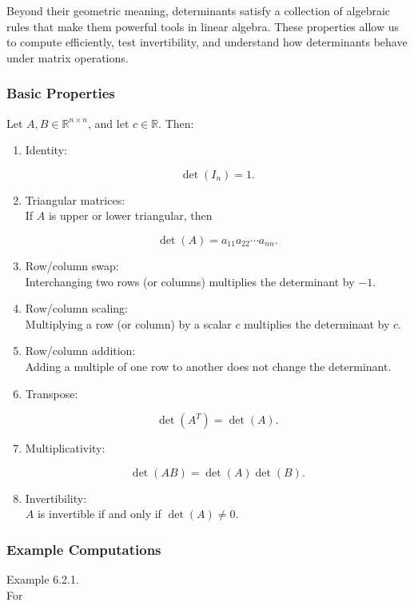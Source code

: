 \documentclass[
  12pt,
  a4paper,
]{article}
\begin{document}
Beyond their geometric meaning, determinants satisfy a collection of
algebraic rules that make them powerful tools in linear algebra. These
properties allow us to compute efficiently, test invertibility, and
understand how determinants behave under matrix operations.

\subsubsection{Basic Properties}\label{basic-properties}

Let \(A, B \in \mathbb{R}^{n \times n}\), and let \(c \in \mathbb{R}\).
Then:

\begin{enumerate}
\def\labelenumi{\arabic{enumi}.}
\item
  Identity:

  \[\det(I_n) = 1.\]
\item
  Triangular matrices:\\
  If \(A\) is upper or lower triangular, then

  \[\det(A) = a_{11} a_{22} \cdots a_{nn}.\]
\item
  Row/column swap:\\
  Interchanging two rows (or columns) multiplies the determinant by
  \(-1\).
\item
  Row/column scaling:\\
  Multiplying a row (or column) by a scalar \(c\) multiplies the
  determinant by \(c\).
\item
  Row/column addition:\\
  Adding a multiple of one row to another does not change the
  determinant.
\item
  Transpose:

  \[\det(A^T) = \det(A).\]
\item
  Multiplicativity:

  \[\det(AB) = \det(A)\det(B).\]
\item
  Invertibility:\\
  \(A\) is invertible if and only if \(\det(A) \neq 0\).
\end{enumerate}

\subsubsection{Example Computations}\label{example-computations}

Example 6.2.1.\\
For
\end{document}
